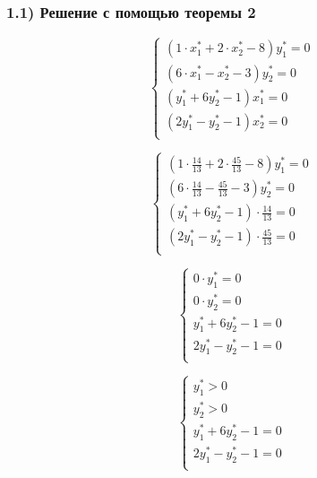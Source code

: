 \subsubsection{1.1) Решение с помощью теоремы 2}

\begin{equation*}
    \begin{cases}
        (1 \cdot x_1^{*} + 2 \cdot x_2^{*} - 8)y_1^{*} = 0\\
        (6 \cdot x_1^{*} - x_2^{*} - 3)y_2^{*} = 0\\
        (y_1^{*} + 6y_2^{*} - 1)x_1^{*} = 0\\
        (2y_1^{*} - y_2^{*} - 1)x_2^{*} = 0\\
    \end{cases}
\end{equation*}

\begin{equation*}
    \begin{cases}
        (1 \cdot \frac{14}{13} + 2 \cdot \frac{45}{13} - 8)y_1^{*} = 0\\
        (6 \cdot \frac{14}{13} - \frac{45}{13} - 3)y_2^{*} = 0\\
        (y_1^{*} + 6y_2^{*} - 1) \cdot \frac{14}{13} = 0\\
        (2y_1^{*} - y_2^{*} - 1) \cdot \frac{45}{13} = 0\\
    \end{cases}
\end{equation*}

\begin{equation*}
    \begin{cases}
        0 \cdot y_1^{*} = 0\\
        0 \cdot y_2^{*} = 0\\
        y_1^{*} + 6y_2^{*} - 1 = 0\\
        2y_1^{*} - y_2^{*} - 1 = 0\\
    \end{cases}
\end{equation*}

\begin{equation*}
    \begin{cases}
        y_1^{*} > 0\\
        y_2^{*} > 0\\
        y_1^{*} + 6y_2^{*} - 1 = 0\\
        2y_1^{*} - y_2^{*} - 1 = 0\\
    \end{cases}
\end{equation*}

